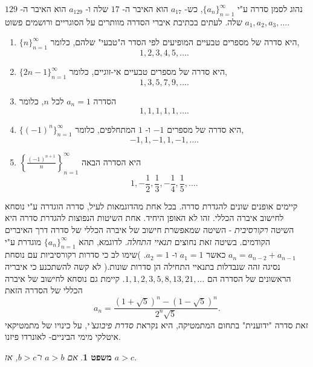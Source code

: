 \documentclass[12pt]{book}
\theoremstyle{plain}
\newtheorem{theorem}{משפט}[chapter]
\theoremstyle{definition}
\begin{document}
נהוג לסמן סדרה ע"י 
$\{a_n\}_{n=1}^\infty$, 
כש- 
$a_{17}$ 
הוא האיבר ה- 
$17$ 
שלה ו- 
$a_{129}$ 
הוא האיבר ה- 
$129$ 
שלה. 
לעתים בכתיבת איברי הסדרה מוותרים על הסוגריים ורושמים פשוט 
$a_1,a_2,a_3,\ldots$. 

\begin{exsample}\rm
    \begin{enumerate}
         \item 
$\{n\}_{n=1}^\infty$ 
היא סדרה של מספרים טבעיים המופיעים לפי הסדר ה"טבעי" שלהם, כלומר,
$$1,2,3,4,5,\ldots.$$
\item $\{2n-1\}_{n=1}^\infty$ 
היא סדרה של מספרים טבעיים אי-זוגיים, 
כלומר, 
$$1,3,5,7,9,\ldots.$$
\item הסדרה 
$a_n=1$ 
לכל 
$n$, 
כלומר 
$$1,1,1,1,1,\ldots.$$
\item $\{(-1)^n\}_{n=1}^\infty$ 
היא סדרה של מספרים 
$-1$ 
ו- 
$1$ 
המתחלפים, כלומר, 
$$-1,1,-1,1,-1,\ldots.$$
\item $\left\{\frac{(-1)^{n+1}}{n}\right\}_{n=1}^\infty$ 
היא הסדרה הבאה 
$$1,-\frac{1}{2},\frac{1}{3},-\frac{1}{4},\frac{1}{5},\ldots.$$
    \end{enumerate}
\end{exsample}


קיימים אופנים שונים להגדרת סדרה. בכל אחת מהדוגמאות לעיל, סדרה הוגדרה ע"י נוסחא לחישוב איברה הכללי. 
זהו לא האופן היחיד. 
אחת השיטות הנפוצות להגדרת סדרה היא השיטה 
{\it רקורסיבית} - 
השיטה שמאפשרת חישוב של איברה הכללי של סדרה דרך האיברים הקודמים. בשיטה זאת נחוצים 
{\it תנאיי התחלה}. 
לדוגמא, 
תהא 
$\{a_n\}_{n=1}^\infty$ 
מוגדרת ע"י 
$a_{n}=a_{n-2}+a_{n-1}$ 
כאשר 
$a_1=1$
ו- 
$a_2=1$. 
)שימו לב כי סדרות רקורסיביות עם נוסחת נסיגה זהה שנבדלות בתנאיי התחילה הן סדרות שונות.(
לא קשה להשתכנע כי איבריה הראשונים של הסדרה הם
$1,1,2,3,5,8,13,21,\ldots$. 
קיימת גם נוסחא לחישוב של איברה הכללי של הסדרה הזאת
$$a_n=\frac{(1+\sqrt{5})^n-(1-\sqrt{5})^n}{2^n\sqrt{5}}.$$
זאת סדרה "ידוענית" בתחום המתמטיקה, היא נקראת 
{\it סדרת פיבונצ'י}, 
על כינויו של מתמטיקאי איטלקי מימי הביניים- לאונרדו פיזנו.

\begin{theorem}
אם \( a > b \) ו־\( b > c \), אז \( a > c \).
\end{theorem}
\end{document}
